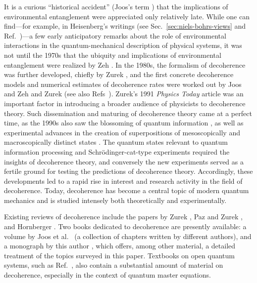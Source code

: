 \documentclass[3p,sort&compress,12pt]{elsarticle}
\begin{document}
It is a curious ``historical accident'' (Joos's term \cite[p.~13]{Joos:1999:po}) that the implications of environmental entanglement were appreciated only relatively late. While one can find---for example, in Heisenberg's writings (see Sec.~\ref{sec:niels-bohrs-views} and Ref.~\cite{Camilleri:2015:oo})---a few early anticipatory remarks about the role of environmental interactions in the quantum-mechanical description of physical systems, it was not until the 1970s that the ubiquity and implications of environmental entanglement were realized by Zeh \cite{Zeh:1970:yt,Kubler:1973:ux}. In the 1980s, the formalism of decoherence was further developed, chiefly by Zurek \cite{Zurek:1981:dd,Zurek:1982:tv}, and the first concrete decoherence models and numerical estimates of decoherence rates were worked out by Joos and Zeh \cite{Joos:1985:iu} and Zurek \cite{Zurek:1986:uz} (see also Refs~\cite{Walls:1985:pp,Walls:1985:lm,Caldeira:1985:tt}). Zurek's 1991 \emph{Physics Today} article \cite{Zurek:1991:vv} was an important factor in introducing a broader audience of physicists to decoherence theory. Such dissemination and maturing of decoherence theory came at a perfect time, as the 1990s also saw the blossoming of quantum information \cite{Feynman:1982:yy,Deutsch:1985:ym,Deutsch:1992:tv,Berthiaume:1992:lk,Berthiaume:1992:lm,Bernstein:1993:yy,Simon:1994:lk,Shor:1994:om,Shor:1997:tt,Grover:1996:rr,Grover:1997:mm}, as well as experimental advances in the creation of superpositions of mesoscopically and macroscopically distinct states \cite{Brune:1996:om,Arndt:1999:rc,Friedman:2000:rr,Wal:2000:om}. The quantum states relevant to quantum information processing and Schr\"odinger-cat-type experiments required the insights of decoherence theory, and conversely the new experiments served as a fertile ground for testing the predictions of decoherence theory. Accordingly, these developments led to a rapid rise in interest and research activity in the field of decoherence. Today, decoherence has become a central topic of modern quantum mechanics and is studied intensely both theoretically and experimentally.

Existing reviews of decoherence include the papers by Zurek \cite{Zurek:2002:ii}, Paz and Zurek \cite{Paz:2001:aa}, and Hornberger \cite{Hornberger:2009:aq}. Two books dedicated to decoherence are presently available: a volume by Joos et al.\ \cite{Joos:2003:jh} (a collection of chapters written by different authors), and a monograph by this author \cite{Schlosshauer:2007:un}, which offers, among other material, a detailed treatment of the topics surveyed in this paper. Textbooks on open quantum systems, such as Ref.~\cite{Breuer:2002:oq}, also contain a substantial amount of material on decoherence, especially in the context of quantum master equations. 
\end{document}
